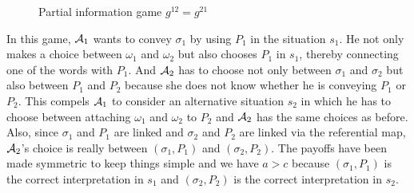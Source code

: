 \begin{figure}[h] 
 
\caption{Partial information game $g^{12} = g^{21}$} \label{fig:g12g21}
\end{figure}


%
%
%
%
%
%
%
%
%


In this game, ${\cal A}_1$ wants to convey $\sigma_1$ by using $P_1$ in the situation $s_1$. He not only makes a choice between $\omega_1$ and $\omega_2$ but also chooses $P_1$ in $s_1$, thereby connecting one of the words with $P_1$. And ${\cal A}_2$ has to choose not only between $\sigma_1$ and $\sigma_2$ but also between $P_1$ and $P_2$ because she does not know whether he is conveying $P_1$ or $P_2$. This compels ${\cal A}_1$ to consider an alternative situation $s_2$ in which he has to choose between attaching $\omega_1$ and $\omega_2$ to $P_2$ and ${\cal A}_2$ has the same choices as before. Also, since $\sigma_1$ and $P_1$ are linked and $\sigma_2$ and $P_2$ are linked via the referential map,  ${\cal A}_2$'s choice is really between $(\sigma_1,P_1)$ and $(\sigma_2,P_2)$. The payoffs have been made symmetric to keep things simple and we have $a > c$ because $(\sigma_1,P_1)$ is the correct interpretation in $s_1$ and $(\sigma_2,P_2)$ is the correct interpretation in $s_2$.

